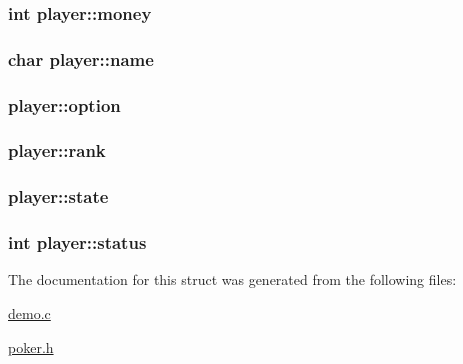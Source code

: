 \hypertarget{structplayer_af29ec89834ba3675a99b4008b10422f2}{
\subsubsection[{money}]{\setlength{\rightskip}{0pt plus 5cm}int player\+::money}}\label{structplayer_af29ec89834ba3675a99b4008b10422f2}
\hypertarget{structplayer_a284acbcfa653b66a860783f6d2b33e0d}{
\subsubsection[{name}]{\setlength{\rightskip}{0pt plus 5cm}char player\+::name}}\label{structplayer_a284acbcfa653b66a860783f6d2b33e0d}
\hypertarget{structplayer_abc56330c6c862a2882721f2f9aac226e}{
\subsubsection[{option}]{ player\+::option}}\label{structplayer_abc56330c6c862a2882721f2f9aac226e}
\hypertarget{structplayer_a9cfae91cf808c1b7518f48508865b29f}{
\subsubsection[{rank}]{ player\+::rank}}\label{structplayer_a9cfae91cf808c1b7518f48508865b29f}
\hypertarget{structplayer_ac23f62455d34a7b5d841b7e93284ee14}{
\subsubsection[{state}]{ player\+::state}}\label{structplayer_ac23f62455d34a7b5d841b7e93284ee14}
\hypertarget{structplayer_a79aedffc8c59ba13e1b882d3066fd8a9}{
\subsubsection[{status}]{\setlength{\rightskip}{0pt plus 5cm}int player\+::status}}\label{structplayer_a79aedffc8c59ba13e1b882d3066fd8a9}


The documentation for this struct was generated from the following files\+:\begin{DoxyCompactItemize}
\item 
\hyperlink{demo_8c}{demo.\+c}\item 
\hyperlink{poker_8h}{poker.\+h}\end{DoxyCompactItemize}
